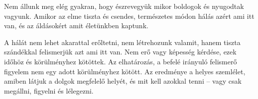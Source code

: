 Nem állunk meg elég gyakran, hogy észrevegyük mikor boldogok és
nyugodtak vagyunk. Amikor az elme tiszta és csendes, természetes módon
hálás azért ami itt van, és az áldásokért amit életünkben kaptunk.

A hálát nem lehet akarattal erőltetni, nem létrehozunk valamit, hanem
tiszta szándékkal felismerjük azt ami itt van. Nem erő vagy képesség
kérdése, ezek időhöz és körülményhez kötöttek. Az elhatározás, a befelé
irányuló felismerő figyelem nem egy adott körülményhez kötött. Az
eredménye a helyes szemlélet, amiben látjuk a dolgok megfelelő helyét,
és mit kell azokkal tenni -- vagy csak megállni, figyelni és lélegezni.
